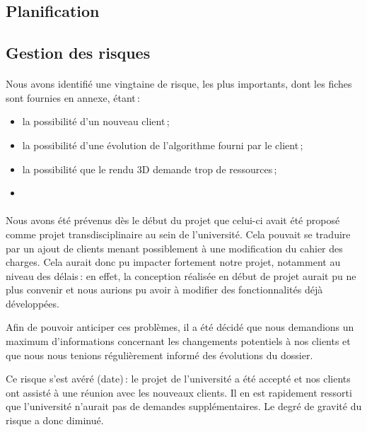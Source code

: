 \documentclass{scrartcl}
\begin{document}
\subsection{Planification}
\paragraph{}


\subsection{Gestion des risques}
\paragraph{}
Nous avons identifié une vingtaine de risque, les plus importants, dont les fiches sont fournies en annexe, étant\,: 
\begin{itemize}
    \item la possibilité d'un nouveau client\,;
    \item la possibilité d'une évolution de l'algorithme fourni par le client\,;
    \item la possibilité que le rendu 3D demande trop de ressources\,;
    \item 
\end{itemize}

\paragraph{}
Nous avons été prévenus dès le début du projet que celui-ci avait été proposé comme projet transdisciplinaire au sein de l'université. Cela pouvait se traduire par un ajout de clients menant possiblement à une modification du cahier des charges. Cela aurait donc pu impacter fortement notre projet, notamment au niveau des délais\,: en effet, la conception réalisée en début de projet aurait pu ne plus convenir et nous aurions pu avoir à modifier des fonctionnalités déjà développées.

Afin de pouvoir anticiper ces problèmes, il a été décidé que nous demandions un maximum d'informations concernant les changements potentiels à nos clients et que nous nous tenions régulièrement informé des évolutions du dossier.

Ce risque s'est avéré (date)\,: le projet de l'université a été accepté et nos clients ont assisté à une réunion avec les nouveaux clients. Il en est rapidement ressorti que l'université n'aurait pas de demandes supplémentaires. Le degré de gravité du risque a donc diminué.
\end{document}
